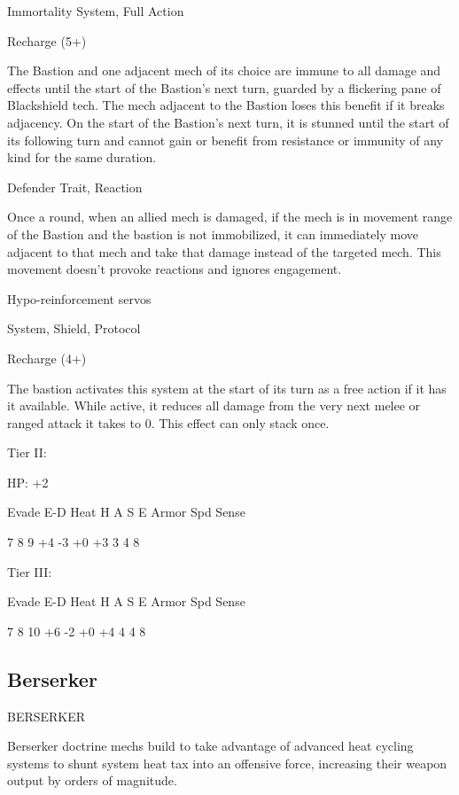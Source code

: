 Immortality  
System, Full Action
 
Recharge (5+)
 
The Bastion and one adjacent mech of its choice are immune to all damage and effects until the  
start of the Bastion’s next turn, guarded by a flickering pane of Blackshield tech. The mech  
adjacent to the Bastion loses this benefit if it breaks adjacency. On the start of the Bastion’s next  
turn, it is stunned until the start of its following turn and cannot gain or benefit from resistance or  
immunity of any kind for the same duration.
 

Defender  
Trait, Reaction
 
Once a round, when an allied mech is damaged, if the mech is in movement range of the Bastion  
and the bastion is not immobilized, it can immediately move adjacent to that mech and take that  
damage instead of the targeted mech. This movement doesn't provoke reactions and ignores  
engagement.
 

Hypo-reinforcement servos
 
System, Shield, Protocol
 
Recharge (4+)
 
The bastion activates this system at the start of its turn as a free action if it has it available. While  
active, it reduces all damage from the very next melee or ranged attack it takes to 0. This effect  
can only stack once.
 

Tier II:
 
HP: +2
 

          Evade     E-D    Heat    H     A     S     E       Armor        Spd      Sense 

          7         8      9       +4    -3    +0   +3       3            4        8 

Tier III:  

          Evade     E-D    Heat    H     A     S     E       Armor        Spd      Sense 

          7         8      10      +6    -2    +0   +4       4            4        8 

                                                                                                                 

\subsection{Berserker}
                                            BERSERKER  

Berserker doctrine mechs build to take advantage of advanced heat cycling systems to shunt  
system heat tax into an offensive force, increasing their weapon output by orders of magnitude.   

